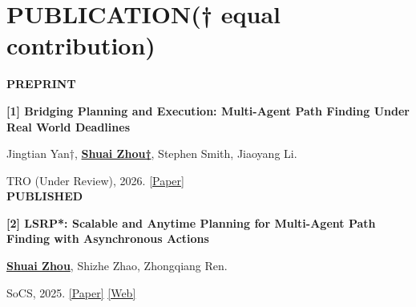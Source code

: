 \documentclass[a4paper,9pt]{extarticle}
\begin{document}
\section*{{\textbf{\fontsize{14pt}{8pt}\selectfont P}\textbf{\scshape UBLICATION}}(† equal contribution)}
{\textbf{\fontsize{12pt}{4pt}\selectfont P}\textbf{\scshape REPRINT}}
\par\vspace{4pt}\noindent
\par\textbf{[1] Bridging Planning and Execution: Multi-Agent Path Finding Under Real World Deadlines}
\par\textup{Jingtian Yan†, \underline{\textbf{Shuai Zhou†}}, Stephen Smith, Jiaoyang Li. }
\par\textup{TRO (Under Review), 2026. \href{https://arxiv.org/abs/2511.21886}{[Paper]}}
\\   
{\textbf{\fontsize{12pt}{4pt}\selectfont P}\textbf{\scshape UBLISHED}}
\par\vspace{4pt}\noindent
\par\textbf{[2] LSRP*: Scalable and Anytime Planning for Multi-Agent Path Finding with Asynchronous Actions}
\par\textup{\underline{\textbf{Shuai Zhou}}, Shizhe Zhao, Zhongqiang Ren.}   %
\par\textup{SoCS, 2025. \href{https://doi.org/10.1609/socs.v18i1.36016}{[Paper]}  \href{https://rap-lab.github.io/research/mapfaa}{[Web]}} 
\end{document}
